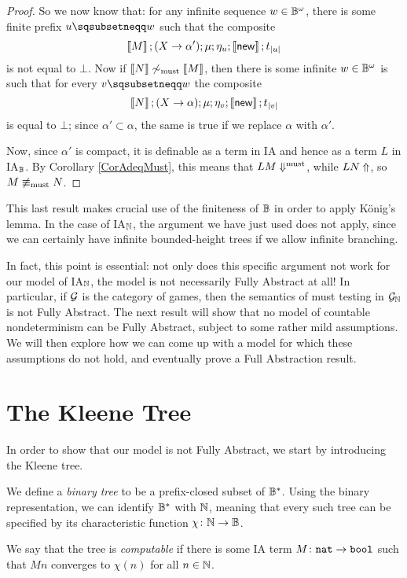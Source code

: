 \begin{proof}
  So we now know that: for any infinite sequence $w\in \mathbb{B}^\omega$, there is some finite prefix $u\pprefix w$ such that the composite
  \[
    \left\llbracket M\right\rrbracket;(X \to \alpha');\mu;\eta_u;\left\llbracket\operatorname{{\mathsf{new}}}\right\rrbracket;t_{|u|}
    \]
  is not equal to $\bot$.  
  Now if $\left\llbracket N\right\rrbracket\not\sim_{\operatorname{must}}\left\llbracket M\right\rrbracket$, then there is some infinite $w\in \mathbb{B}^\omega$ is such that for every $v\pprefix w$ the composite
  \[
    \left\llbracket N\right\rrbracket;(X \to \alpha);\mu;\eta_v;\left\llbracket\operatorname{{\mathsf{new}}}\right\rrbracket;t_{|v|}
    \]
  is equal to $\bot$; since $\alpha'\subset \alpha$, the same is true if we replace $\alpha$ with $\alpha'$.

  Now, since $\alpha'$ is compact, it is definable as a term in IA and hence as a term $L$ in IA${}_{\mathbb{B}}$.  
  By Corollary \ref{CorAdeqMust}, this means that $L M \Downarrow^{\text{must}}$, while $L N\Uparrow$, so $M\not\equiv_{\operatorname{must}}N$.
\end{proof}

This last result makes crucial use of the finiteness of $\mathbb{B}$ in order to apply K\"{o}nig's lemma.  
In the case of IA${}_{\mathbb{N}}$, the argument we have just used does not apply, since we can certainly have infinite bounded-height trees if we allow infinite branching.

In fact, this point is essential: not only does this specific argument not work for our model of IA${}_{\mathbb{N}}$, the model is not necessarily Fully Abstract at all! 
In particular, if $\mathcal G$ is the category of games, then the semantics of must testing in $\mathcal G_{\mathbb{N}}$ is not Fully Abstract.
The next result will show that no model of countable nondeterminism can be Fully Abstract, subject to some rather mild assumptions.  
We will then explore how we can come up with a model for which these assumptions do not hold, and eventually prove a Full Abstraction result.

\section{The Kleene Tree}
\label{SecKleene}

In order to show that our model is not Fully Abstract, we start by introducing the Kleene tree.

We define a \emph{binary tree} to be a prefix-closed subset of $\mathbb{B}^*$.  
Using the binary representation, we can identify $\mathbb{B}^*$ with $\mathbb{N}$, meaning that every such tree can be specified by its characteristic function $\chi \colon \mathbb{N} \to \mathbb{B}$.

We say that the tree is \emph{computable} if there is some IA term $M\colon {\mathtt{nat}} \to {\mathtt{bool}}$ such that $M n$ converges to $\chi(n)$ for all $n\in\mathbb{N}$.

